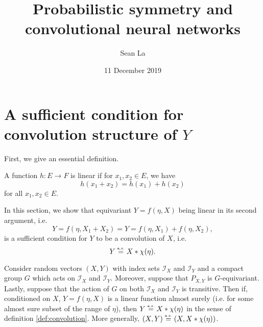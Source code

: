 \documentclass[10pt]{article}
\title{Probabilistic symmetry and convolutional neural networks} %
\author{Sean La} %
\date{11 December 2019} %
\begin{document}
\maketitle



\section{A sufficient condition for convolution structure of $Y$}
First, we give an essential definition.
\begin{definition} \label{def:linear}
	A function $h: E \to F$ is linear if for $x_1, x_2 \in E$, we have
	$$
		h(x_1 + x_2) = h(x_1) + h(x_2)
	$$ 
	for all $x_1,x_2 \in E$.
\end{definition}
In this section, we show that equivariant $Y = f(\eta,X)$ being linear in its second argument, i.e.
$$
	Y = f(\eta, X_1 + X_2) = Y = f(\eta,X_1) + f(\eta,X_2),
$$
is a sufficient condition for $Y$ to be a convolution of $X$, i.e.
$$
	Y \stackrel{\text{\rm\tiny a.s.}}{=} X * \chi(\eta).
$$
\begin{theorem}
	Consider random vectors $(X,Y)$ with index sets $\mathcal{I}_X$ and $\mathcal{I}_Y$ and a compact group $G$ which acts on $\mathcal{I}_X$ and $\mathcal{I}_Y$.
	Moreover, suppose that $P_{X,Y}$ is $G$-equivariant.
	Lastly, suppose that the action of $G$ on both $\mathcal{I}_X$ and $\mathcal{I}_Y$ is transitive.
	Then if, conditioned on $X$, $Y = f(\eta, X)$ is a linear function almost surely (i.e. for some almost sure subset of the range of $\eta$), then $Y \stackrel{\text{\rm\tiny a.s.}}{=} X * \chi(\eta)$ in the sense of definition \ref{def:convolution}.
	More generally, $(X,Y) \stackrel{\text{\rm\tiny a.s.}}{=} (X,X * \chi(\eta))$.
\end{theorem}
\end{document}
